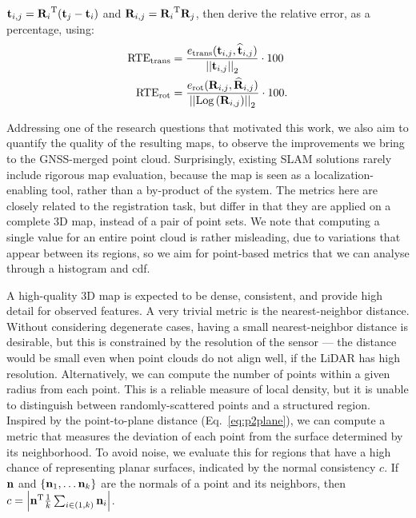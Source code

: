 $\mathbf{t}_{i,j} = {\mathbf{R}_i}^\text{T}(\mathbf{t}_j - \mathbf{t}_i)$
and
$\mathbf{R}_{i,j} = {\mathbf{R}_i}^\text{T}\mathbf{R}_j$,
then derive the relative error, as a percentage, using:
\begin{equation}
    \begin{aligned}
        \text{RTE}_{\text{trans}} & =
        \frac{e_{\text{trans}}(\mathbf{t}_{i,j}, \widehat{\mathbf{t}}_{i,j})}{\left|\left|{\mathbf{t}_{i,j}}\right|\right|_2} \cdot 100                  \\
        \text{RTE}_{\text{rot}}   & =\frac{
            e_{\text{rot}}(\mathbf{R}_{i,j}, \widehat{\mathbf{R}}_{i,j} ) }{\left|\left|{\text{Log}\left({\mathbf{R}_{i,j}}\right)}\right|\right|_2} \cdot 100    \text{.} \\
    \end{aligned}
\end{equation}

Addressing one of the research questions that motivated this work, we also aim to quantify the quality of the resulting maps, to observe the improvements we bring to the GNSS-merged point cloud. Surprisingly, existing SLAM solutions rarely include rigorous map evaluation, because the map is seen as a localization-enabling tool, rather than a by-product of the system.
The metrics here are closely related to the registration task, but differ in that they are applied on a complete 3D map, instead of a pair of point sets. We note that computing a single value for an entire point cloud is rather misleading, due to variations that appear between its regions, so we aim for point-based metrics that we can analyse through a histogram and \acrfull{cdf}.

A high-quality 3D map is expected to be dense, consistent, and provide high detail for observed features. A very trivial metric is the nearest-neighbor distance. Without considering degenerate cases, having a small nearest-neighbor distance is desirable, but this is constrained by the resolution of the sensor --- the distance would be small even when point clouds do not align well, if the LiDAR has high resolution.
Alternatively, we can compute the number of points within a given radius from each point. This is a reliable measure of local density, but it is unable to distinguish between randomly-scattered points and a structured region.
Inspired by the point-to-plane distance (Eq.~\ref{eq:p2plane}), we can compute a metric that measures the deviation of each point from the surface determined by its neighborhood. To avoid noise, we evaluate this for regions that have a high chance of representing planar surfaces, indicated by the normal consistency $c$.
If $\mathbf{n}$ and \mbox{$\left\{\mathbf{n}_1, \dots \mathbf{n}_k\right\}$} are the normals of a point and its neighbors, then
\mbox{$c = \left|{{\mathbf{n}}^\text{T} \frac{1}{k}\sum_{i \in (1, k)} \mathbf{n}_i}\right|$}.


